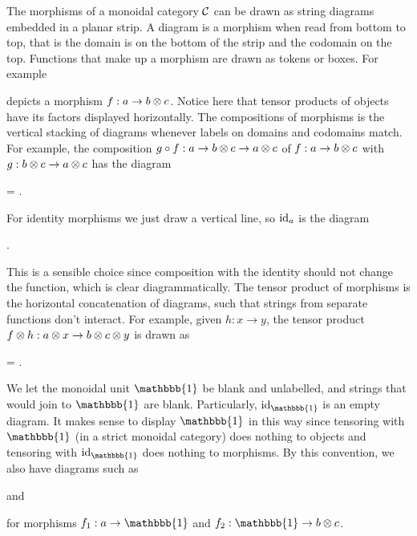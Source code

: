 The morphisms of a monoidal category $\mathcal{C}$ can be drawn as string diagrams embedded in a planar strip. A diagram is a morphism when read from bottom to top, that is the domain is on the bottom of the strip and the codomain on the top. Functions that make up a morphism are drawn as tokens or boxes. For example
\begin{center}
\end{center}
depicts a morphism $f: a \to b \otimes c$. Notice here that tensor products of objects have its factors displayed horizontally. The compositions of morphisms is the vertical stacking of diagrams whenever labels on domains and codomains match. For example, the composition $g \circ f: a \to b \otimes c \to a \otimes c$ of $f: a \to b \otimes c$ with $g: b \otimes c \to a \otimes c$ has the diagram
\begin{center}
    =
    .
\end{center}
For identity morphisms we just draw a vertical line, so $\operatorname{id}_a$ is the diagram
\begin{center}
    .
\end{center}
This is a sensible choice since composition with the identity should not change the function, which is clear diagrammatically. The tensor product of morphisms is the horizontal concatenation of diagrams, such that strings from separate functions don't interact. For example, given $h:x \to y$, the tensor product $f \otimes h: a \otimes x \to b \otimes c \otimes y$ is drawn as
\begin{center}
    =
    .
\end{center}
We let the monoidal unit $\mathbbb{1}$ be blank and unlabelled, and strings that would join to $\mathbbb{1}$ are blank. Particularly, $\id_\mathbbb{1}$ is an empty diagram. It makes sense to display $\mathbbb{1}$ in this way since tensoring with $\mathbbb{1}$ (in a strict monoidal category) does nothing to objects and tensoring with $\id_\mathbbb{1}$ does nothing to morphisms. By this convention, we also have diagrams such as
\begin{center}
    \quad and \quad
\end{center}
for morphisms $f_1: a \to \mathbbb{1}$ and $f_2: \mathbbb{1} \to b \tensor c$.

